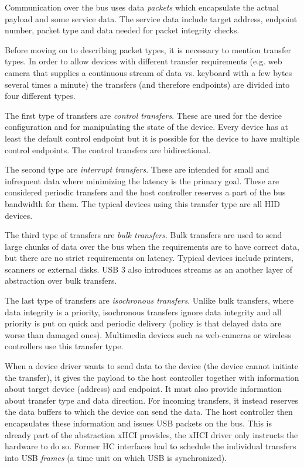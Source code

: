 Communication over the bus uses data \textit{packets} which encapsulate the
actual payload and some service data. The service data include target address,
endpoint number, packet type and data needed for packet integrity checks.

Before moving on to describing packet types, it is necessary to mention
transfer types. In order to allow devices with different transfer requirements
(e.g. web camera that supplies a continuous stream of data vs. keyboard with
a few bytes several times a minute) the transfers (and therefore endpoints) are
divided into four different types.

The first type of transfers are \textit{control transfers}. These are used for
the device configuration and for manipulating the state of the device. Every
device has at least the default control endpoint but it is possible for the
device to have multiple control endpoints. The control transfers are
bidirectional.

The second type are \textit{interrupt transfers}. These are intended for small
and infrequent data where minimizing the latency is the primary goal. These are
considered periodic transfers and the host controller reserves a part of the
bus bandwidth for them. The typical devices using this transfer type are all
HID devices.

The third type of transfers are \textit{bulk transfers}. Bulk transfers are
used to send large chunks of data over the bus when the requirements are to
have correct data, but there are no strict requirements on latency. Typical
devices include printers, scanners or external disks. USB 3 also introduces
streams as an another layer of abstraction over bulk transfers.

The last type of transfers are \textit{isochronous transfers}. Unlike bulk
transfers, where data integrity is a priority, isochronous transfers ignore
data integrity and all priority is put on quick and periodic delivery (policy
is that delayed data are worse than damaged ones). Multimedia devices such as
web-cameras or wireless controllers use this transfer type.

When a device driver wants to send data to the device (the device cannot
initiate the transfer), it gives the payload to the host controller together
with information about target device (address) and endpoint. It must also
provide information about transfer type and data direction. For incoming
transfers, it instead reserves the data buffers to which the device can send
the data. The host controller then encapsulates these information and issues
USB packets on the bus. This is already part of the abstraction xHCI provides,
the xHCI driver only instructs the hardware to do so. Former HC interfaces had
to schedule the individual transfers into USB \emph{frames} (a time unit on
which USB is synchronized).

